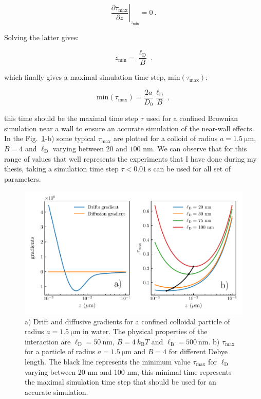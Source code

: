 \begin{equation}
	\left. \frac{\partial \tau_\mathrm{max}}{\partial z} \right| _{z_\mathrm{min} }= 0 ~.
\end{equation} 

Solving the latter gives:

\begin{equation}
	z_\mathrm{min} = \frac{\ell_\mathrm{D}}{B} ~.
\end{equation}


which finally gives a maximal simulation time step, $\mathrm{min}(\tau_\mathrm{max})$:

\begin{equation}
	\mathrm{min}(\tau_\mathrm{max}) =  \frac{2 a}{D_0} \frac{\ell_\mathrm{D}}{B} ~,
\end{equation}

this time should be the maximal time step $\tau$ used for a confined Brownian simulation near a wall to ensure an accurate simulation of the near-wall effects. In the Fig.~\ref{fig.taumax}-b) some typical $\tau_{\mathrm{max}}$ are plotted for a colloid of radius $a=1.5 ~\mathrm{\mu m}$, $B = 4$ and $\ell _\mathrm{D}$ varying between $20$ and $100$ nm. We can observe that for this range of values that well represents the experiments that I have done during my thesis, taking a simulation time step $\tau < 0.01 ~ \mathrm{s}$ can be used for all set of parameters.


\begin{figure}[ht]
	\centering
	\includegraphics{02_body/chapter3/images/simulation_confined_Brownian_motion/maximal_tau.pdf}
	\caption{a) Drift and diffusive gradients for a confined colloidal particle of radius $a = 1.5 ~\mathrm{\mu m}$ in water. The physical properties of the interaction are $\ell_\mathrm{D} = 50 ~ \mathrm{nm}$, $B = 4 ~k_\mathrm{B}T$ and $\ell_\mathrm{B} = 500 ~ \mathrm{nm}$. b) $\tau_\mathrm{max}$ for a particle of radius $a = 1.5 ~\mathrm{\mu m}$ and $B = 4$ for different Debye length. The black line represents the minimum value $\tau_\mathrm{max}$ for $\ell_\mathrm{D}$ varying between 20 nm and 100 nm, this minimal time represents the maximal simulation time step that should be used for an accurate simulation.} 
	\label{fig.taumax}
\end{figure}


